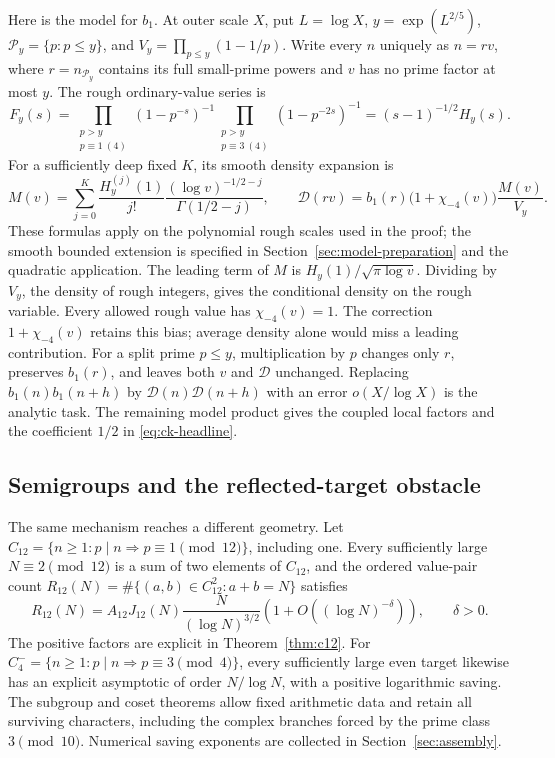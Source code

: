Here is the model for \(b_1\). At outer scale \(X\), put
\(L=\log X\), \(y=\exp(L^{2/5})\),
\(\mathcal P_y=\{p:p\le y\}\), and
\(V_y=\prod_{p\le y}(1-1/p)\). Write every \(n\) uniquely as
\(n=rv\), where \(r=n_{\mathcal P_y}\) contains its full small-prime
powers and \(v\) has no prime factor at most \(y\).
The rough ordinary-value series is
\[
 F_y(s)=\prod_{\substack{p>y\\p\equiv1\ (4)}}(1-p^{-s})^{-1}
         \prod_{\substack{p>y\\p\equiv3\ (4)}}(1-p^{-2s})^{-1}
       =(s-1)^{-1/2}H_y(s).
\]
For a sufficiently deep fixed \(K\), its smooth density expansion is
\[
 M(v)=\sum_{j=0}^K\frac{H_y^{(j)}(1)}{j!}
            \frac{(\log v)^{-1/2-j}}{\Gamma(1/2-j)},\qquad
 \mathcal D(rv)=b_1(r)\bigl(1+\chi_{-4}(v)\bigr)\frac{M(v)}{V_y}.
\]
These formulas apply on the polynomial rough scales used in the proof;
the smooth bounded extension is specified in
Section~\ref{sec:model-preparation} and the quadratic application.
The leading term of \(M\) is \(H_y(1)/\sqrt{\pi\log v}\).
Dividing by \(V_y\), the density of rough integers, gives the
conditional density on the rough variable. Every allowed rough value
has \(\chi_{-4}(v)=1\). The correction \(1+\chi_{-4}(v)\)
retains this bias; average density alone would miss a leading contribution.
For a split prime \(p\le y\), multiplication by \(p\) changes only
\(r\), preserves \(b_1(r)\), and leaves both \(v\) and
\(\mathcal D\) unchanged. Replacing
\(b_1(n)b_1(n+h)\) by \(\mathcal D(n)\mathcal D(n+h)\)
with an error \(o(X/\log X)\) is the analytic task. The remaining
model product gives the coupled local factors and the coefficient
\(1/2\) in \eqref{eq:ck-headline}.

\subsection{Semigroups and the reflected-target obstacle}

The same mechanism reaches a different geometry. Let
\(C_{12}=\{n\ge1:p\mid n\Rightarrow p\equiv1\pmod{12}\}\),
including one. Every sufficiently large \(N\equiv2\pmod{12}\)
is a sum of two elements of \(C_{12}\), and
the ordered value-pair count
\(R_{12}(N)=\#\{(a,b)\in C_{12}^2:a+b=N\}\) satisfies
\begin{equation}\label{eq:opening}
 R_{12}(N)=A_{12}J_{12}(N)\frac{N}{(\log N)^{3/2}}
                  \left(1+O((\log N)^{-\delta})\right),
 \qquad\delta>0.
\end{equation}
The positive factors are explicit in Theorem~\ref{thm:c12}.
For \(C^-_4=\{n\ge1:p\mid n\Rightarrow p\equiv3\pmod4\}\),
every sufficiently large even target likewise has an explicit
asymptotic of order \(N/\log N\), with a positive logarithmic saving.
The subgroup and coset theorems allow fixed arithmetic data and retain
all surviving characters, including the complex branches forced by
the prime class \(3\pmod{10}\). Numerical saving exponents are
collected in Section~\ref{sec:assembly}.

